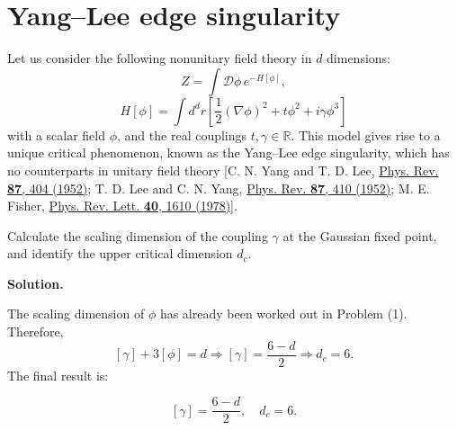 \documentclass[11pt,a4paper]{article}
\newcounter{problem}
\newcounter{saveequation}
\newenvironment{solution}
{
	\par
	\setcounter{saveequation}{\value{equation}}
	\begingroup
	\setcounter{equation}{0}
	\renewcommand{\theequation}{\arabic{problem}.\arabic{equation}}
	\renewcommand{\theHequation}{sol.\arabic{problem}.\arabic{equation}}
	\noindent\textbf{Solution.}\quad
}
{
	\par
	\endgroup
	\setcounter{equation}{\value{saveequation}}
}
\begin{document}
	\section{Yang--Lee edge singularity}
	\label{prob:2}
	Let us consider the following nonunitary field theory in $d$ dimensions:
	\begin{equation}
		Z=\int \mathcal{D}\phi\,e^{-H[\phi]},
	\end{equation}
	\begin{equation}
		H[\phi]=\int d^d r\left[\frac{1}{2}(\nabla\phi)^2+t\phi^2+i\gamma\phi^3\right]
	\end{equation}
	with a scalar field $\phi$, and the real couplings $t,\gamma\in\mathbb{R}$. This model gives rise to a unique critical phenomenon, known as the Yang--Lee edge singularity, which has no counterparts in unitary field theory [C. N. Yang and T. D. Lee, \href{https://doi.org/10.1103/PhysRev.87.404}{Phys. Rev. \textbf{87}, 404 (1952)}; T. D. Lee and C. N. Yang, \href{https://doi.org/10.1103/PhysRev.87.410}{Phys. Rev. \textbf{87}, 410 (1952)}; M. E. Fisher, \href{https://journals.aps.org/prl/abstract/10.1103/PhysRevLett.40.1610}{Phys. Rev. Lett. \textbf{40}, 1610 (1978)}].

	\begin{problembox}
		Calculate the scaling dimension of the coupling $\gamma$ at the Gaussian fixed point, and identify the upper critical dimension $d_c$.
	\end{problembox}
	\begin{solution}
		The scaling dimension of $\phi$ has already been worked out in Problem (1). Therefore,
		\[
		[\gamma]+3[\phi]=d
		\Rightarrow
		[\gamma]=\frac{6-d}{2}
		\Rightarrow
		d_c=6.
		\]
		The final result is:
		\begin{finalanswer}
			\begin{equation}
				\label{fin:6}
				[\gamma]=\frac{6-d}{2},\quad d_c=6.
			\end{equation}
		\end{finalanswer}
	\end{solution}
\end{document}
